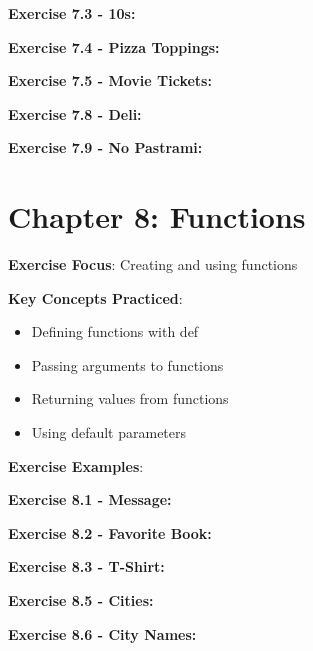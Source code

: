 \textbf{Exercise 7.3 - 10s:}


\textbf{Exercise 7.4 - Pizza Toppings:}


\textbf{Exercise 7.5 - Movie Tickets:}


\textbf{Exercise 7.8 - Deli:}


\textbf{Exercise 7.9 - No Pastrami:}


\section*{Chapter 8: Functions}
\textbf{Exercise Focus}: Creating and using functions

\textbf{Key Concepts Practiced}:
\begin{itemize}
    \item Defining functions with def
    \item Passing arguments to functions
    \item Returning values from functions
    \item Using default parameters
\end{itemize}

\textbf{Exercise Examples}:

\textbf{Exercise 8.1 - Message:}


\textbf{Exercise 8.2 - Favorite Book:}


\textbf{Exercise 8.3 - T-Shirt:}


\textbf{Exercise 8.5 - Cities:}


\textbf{Exercise 8.6 - City Names:}


